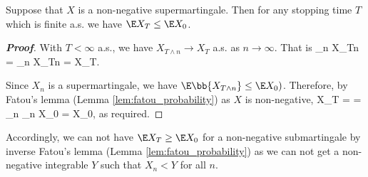 \begin{proposition}
Suppose that $X$ is a non-negative supermartingale. Then for any stopping time $T$ which is finite a.s. we have $\E X_T \leq \E X_0$.
\end{proposition}

\begin{proof}[\bf Proof]
With $T<\infty$ a.s., we have $X_{T\land n} \to X_T$ a.s. as $n\to \infty$. That is
\be
\liminf_n X_{T\land n} = \lim_{n\to \infty} X_{T\land n} = X_T.
\ee

Since $X_n$ is a supermartingale, we have $\E\bb{X_{T\land n}} \leq \E X_0)$. Therefore, by Fatou's lemma (Lemma \ref{lem:fatou_probability}) as $X$ is non-negative,
\be
\E X_T = \E{} = \E{} \leq \liminf_n \E{} \leq \liminf_n \E X_0 = \E X_0,
\ee
as required.
\end{proof}

\begin{remark}
Accordingly, we can not have $\E X_T \geq \E X_0$ for a non-negative submartingale by inverse Fatou's lemma (Lemma \ref{lem:fatou_probability}) as we can not get a non-negative integrable $Y$ such that $X_n<Y$ for all $n$.
\end{remark}

